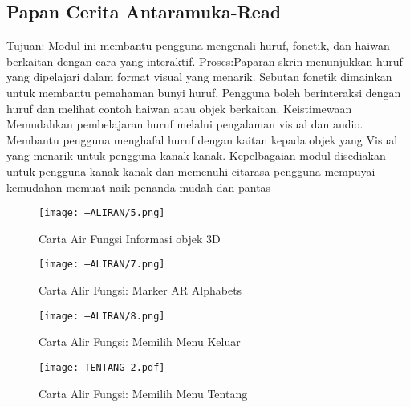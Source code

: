 \begin{itemize}
\begin{itemize}
\begin{itemize}
\begin{itemize}
\begin{itemize}
\begin{itemize}
\begin{itemize}
\begin{itemize}
\begin{flushleft}
\begin{table}
\begin{tabular}{l l l}
 
\end{tabular}
\end{table}

\subsection{Papan Cerita Antaramuka-Read}
Tujuan: Modul ini membantu pengguna mengenali huruf, fonetik, dan haiwan berkaitan dengan cara yang interaktif. Proses:Paparan skrin menunjukkan huruf yang dipelajari dalam format visual yang menarik. Sebutan fonetik dimainkan untuk membantu pemahaman bunyi huruf. Pengguna boleh berinteraksi dengan huruf dan melihat contoh haiwan atau objek berkaitan. Keistimewaan Memudahkan pembelajaran huruf melalui pengalaman visual dan audio. Membantu pengguna menghafal huruf dengan kaitan kepada objek yang Visual yang menarik untuk pengguna kanak-kanak. Kepelbagaian modul disediakan  untuk pengguna kanak-kanak dan memenuhi citarasa pengguna mempuyai kemudahan memuat naik penanda mudah dan pantas





\begin{figure}
    \centering
    \texttt{[image: --ALIRAN/5.png]}
    \caption{Carta Air Fungsi Informasi objek 3D}
    \label{Carta=r}
\end{figure}





\begin{figure}
    \centering
    \texttt{[image: --ALIRAN/7.png]}
    \caption{Carta Alir Fungsi: Marker AR Alphabets}
    \label{fig:--ALIRAN/7.png}
\end{figure}


\begin{figure}
    \centering
    \texttt{[image: --ALIRAN/8.png]}
    \caption{Carta Alir Fungsi: Memilih Menu Keluar}
    \label{fig:--ALIRAN/8.png}
\end{figure}





\begin{figure}
    \centering
    \texttt{[image: TENTANG-2.pdf]}
    \caption{Carta Alir Fungsi: Memilih Menu Tentang}
    \label{fig:enter-label}
\end{figure}




\end{flushleft}
\end{itemize}
\end{itemize}
\end{itemize}
\end{itemize}
\end{itemize}
\end{itemize}
\end{itemize}
\end{itemize}

